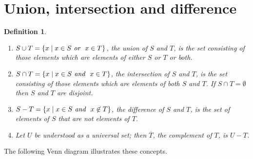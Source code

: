 \documentclass[12pt,a4paper]{article}
\newtheorem{definition}[theorem]{Definition}
\begin{document}
\section{Union, intersection and difference}


\begin{definition}\mbox{}
\begin{enumerate}
\item $S\cup T=\{x\mid x\in S \emph{\ or \ } x\in T\}$, the \emph{union} of $S$ and $T$, is the set consisting of those elements which are elements of \emph{either} $S$ \emph{or} $T$ or both.

\item $S\cap T=\{x\mid x\in S \emph{\ and \ } x\in T\}$, the \emph{intersection} of $S$ and $T$, is the set consisting of those elements which are elements of \emph{both} $S$ \emph{and} $T$. If $S\cap T=\emptyset$ then $S$ and $T$ are \emph{disjoint}.

\item $S-T=\{x\mid x\in S \emph{\ and \ } x\not\in T\}$, the \emph{difference} of $S$ and $T$, is the set of elements of $S$ that are not elements of $T$.

\item Let $U$ be understood as a universal set; then $\overline{T}$, the
\emph{complement} of $T$, is $U-T$.
\end{enumerate}
\end{definition}

The following Venn diagram illustrates these concepts.

\begin{center}
\end{center}
\end{document}

